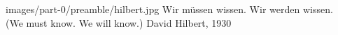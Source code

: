 {images/part-0/preamble/hilbert.jpg}
{
    Wir m\"ussen wissen. Wir werden wissen.\\
    \textnormal{(We must know. We will know.)}
}
{David Hilbert, 1930}
{\cite{smith_2014}}
